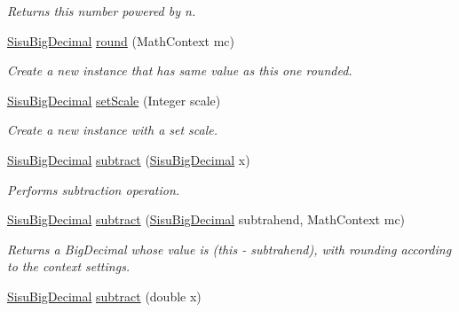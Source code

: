 \begin{DoxyCompactItemize}
\begin{DoxyCompactList}\small\item\em Returns this number powered by n. \end{DoxyCompactList}\item 
\hyperlink{classcom_1_1aarrelaakso_1_1drawl_1_1_sisu_big_decimal}{Sisu\+Big\+Decimal} \hyperlink{classcom_1_1aarrelaakso_1_1drawl_1_1_sisu_big_decimal_a5d192b65bffd1955bb670588ece9ba0e}{round} (Math\+Context mc)
\begin{DoxyCompactList}\small\item\em Create a new instance that has same value as this one rounded. \end{DoxyCompactList}\item 
\hyperlink{classcom_1_1aarrelaakso_1_1drawl_1_1_sisu_big_decimal}{Sisu\+Big\+Decimal} \hyperlink{classcom_1_1aarrelaakso_1_1drawl_1_1_sisu_big_decimal_a28eb72a8179d226e5bcfdbc5c2e103bf}{set\+Scale} (Integer scale)
\begin{DoxyCompactList}\small\item\em Create a new instance with a set scale. \end{DoxyCompactList}\item 
\hyperlink{classcom_1_1aarrelaakso_1_1drawl_1_1_sisu_big_decimal}{Sisu\+Big\+Decimal} \hyperlink{classcom_1_1aarrelaakso_1_1drawl_1_1_sisu_big_decimal_a44ef5723298dfa0e8fc62506fdc059cd}{subtract} (\hyperlink{classcom_1_1aarrelaakso_1_1drawl_1_1_sisu_big_decimal}{Sisu\+Big\+Decimal} x)
\begin{DoxyCompactList}\small\item\em Performs subtraction operation. \end{DoxyCompactList}\item 
\hyperlink{classcom_1_1aarrelaakso_1_1drawl_1_1_sisu_big_decimal}{Sisu\+Big\+Decimal} \hyperlink{classcom_1_1aarrelaakso_1_1drawl_1_1_sisu_big_decimal_a8a237e36134bf0cdb87c3b53b3aaa9cc}{subtract} (\hyperlink{classcom_1_1aarrelaakso_1_1drawl_1_1_sisu_big_decimal}{Sisu\+Big\+Decimal} subtrahend, Math\+Context mc)
\begin{DoxyCompactList}\small\item\em Returns a Big\+Decimal whose value is (this -\/ subtrahend), with rounding according to the context settings. \end{DoxyCompactList}\item 
\hyperlink{classcom_1_1aarrelaakso_1_1drawl_1_1_sisu_big_decimal}{Sisu\+Big\+Decimal} \hyperlink{classcom_1_1aarrelaakso_1_1drawl_1_1_sisu_big_decimal_abde4af9e4686abbbdb1539505f7223ae}{subtract} (double x)

\end{DoxyCompactItemize}
